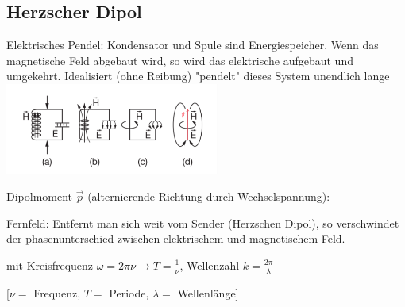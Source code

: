 \subsection{Herzscher Dipol}
    Elektrisches Pendel: Kondensator und Spule sind Energiespeicher.
    Wenn das magnetische Feld abgebaut wird, so wird das elektrische aufgebaut und umgekehrt.
    Idealisiert (ohne Reibung) "pendelt" dieses System unendlich lange
    \centering
    \includegraphics[height = 30mm]{src/images/herzscher_dipol.png}

    Dipolmoment $\vec{p}$ (alternierende Richtung durch Wechselspannung):

    Fernfeld: Entfernt man sich weit vom Sender (Herzschen Dipol), so verschwindet der phasenunterschied zwischen elektrischem und magnetischem Feld.

    mit Kreisfrequenz $\omega = 2 \pi \nu \rightarrow T = \frac{1}{\nu}$, Wellenzahl $k = \frac{2 \pi}{\lambda}$
    
    [$\nu = $ Frequenz, $T = $ Periode, $\lambda = $ Wellenlänge]
    \vfill \null \columnbreak
